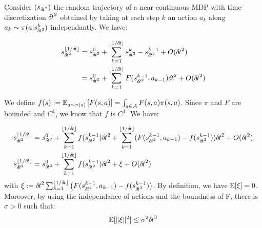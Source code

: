 
Consider $(s_{{\delta\hspace{-.1em}t}^2})$ the random trajectory of a near-continuous MDP with time-discretization ${\delta\hspace{-.1em}t}^2$ obtained by taking at each step $k$ an action $a_k$ along $a_k \sim \pi(a| s_{{\delta\hspace{-.1em}t}^2}^k)$ independantly. We have:

\begin{align}
  s_{{\delta\hspace{-.1em}t}^2}^{\lfloor 1/{\delta\hspace{-.1em}t}\rfloor} &= s_{{\delta\hspace{-.1em}t}^2}^0 + \sum_{k=1}^{\lfloor 1/{\delta\hspace{-.1em}t}\rfloor} s_{{\delta\hspace{-.1em}t}^2}^{k} -  s_{{\delta\hspace{-.1em}t}^2}^{k-1} + O({\delta\hspace{-.1em}t}^2) \\
                    &= s_{{\delta\hspace{-.1em}t}^2}^0 + \sum_{k=1}^{\lfloor 1/{\delta\hspace{-.1em}t} \rfloor} F(s_{{\delta\hspace{-.1em}t}^2}^{k-1}, a_{k-1}){\delta\hspace{-.1em}t}^2 + O({\delta\hspace{-.1em}t}^2)
\end{align}

We define $f(s) \mathrel{\mathop{:}}= \mathbb{E}_{a \sim \pi(s)}\left[F(s, a)\right] = \int_{a\in{\cal A}}F(s, a)\pi(s, a)$. Since $\pi$ and $F$ are bounded and $C^1$, we know that $f$ is $C^1$. We have: 

  \begin{align}
    s_{{\delta\hspace{-.1em}t}^2}^{\lfloor 1/{\delta\hspace{-.1em}t}\rfloor}   & = s_{{\delta\hspace{-.1em}t}^2}^0 + \sum_{k=1}^{\lfloor 1/{\delta\hspace{-.1em}t}\rfloor}
                        f(s_{{\delta\hspace{-.1em}t}^2}^{k-1}){\delta\hspace{-.1em}t}^2 + \sum_{k=1}^{\lfloor 1/{\delta\hspace{-.1em}t}\rfloor} (F(s_{{\delta\hspace{-.1em}t}^2}^{k-1}, a_{k-1}) - f(s_{{\delta\hspace{-.1em}t}^2}^{k-1})){\delta\hspace{-.1em}t}^2 + O({\delta\hspace{-.1em}t}^2) \\
     s_{{\delta\hspace{-.1em}t}^2}^{\lfloor 1/{\delta\hspace{-.1em}t}\rfloor}  &= s_{{\delta\hspace{-.1em}t}^2}^0 + \sum_{k=1}^{\lfloor 1/{\delta\hspace{-.1em}t}\rfloor}
                        f(s_{{\delta\hspace{-.1em}t}^2}^{k-1}){\delta\hspace{-.1em}t}^2 + \xi + O({\delta\hspace{-.1em}t}^2)
  \end{align}
  with $\xi \mathrel{\mathop{:}}=  {\delta\hspace{-.1em}t}^2 \sum_{k=1}^{\lfloor 1/{\delta\hspace{-.1em}t}\rfloor} \left(F(s_{{\delta\hspace{-.1em}t}^2}^{k-1}, a_{k-1}) - f(s_{{\delta\hspace{-.1em}t}^2}^{k-1})\right)$. By definition, we have $\mathbb{E}[\xi] = 0$. Moreover, by using the independance of actions and the boundness of F, there is $\sigma >0$ such that:
  \begin{align}
    \mathbb{E}[\|\xi\|^2] \leq \sigma^2{\delta\hspace{-.1em}t}^3
  \end{align}

